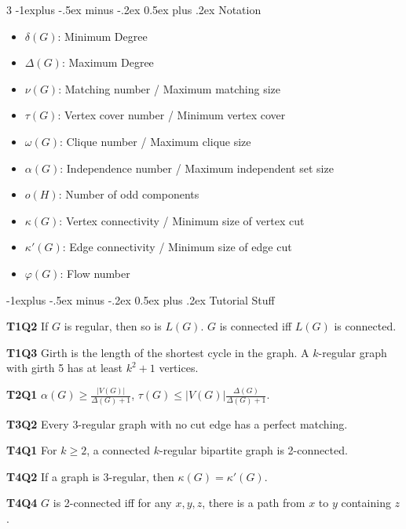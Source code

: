 \documentclass[10pt, landscape]{article}
\makeatletter
\renewcommand{\section}{\@startsection{section}{1}{0mm}%
                                {-1ex plus -.5ex minus -.2ex}%
                                {0.5ex plus .2ex}%
                                {\normalfont\large\bfseries}}
\renewcommand{\section}{\@startsection{section}{2}{0mm}%
                                {-1explus -.5ex minus -.2ex}%
                                {0.5ex plus .2ex}%
                                {\normalfont\normalsize\bfseries}}
\makeatother
\begin{document}
\begin{multicols*}{3}
\section{Notation}
\begin{itemize}
    \item \textbf{$\delta(G)$}: Minimum Degree
    \item \textbf{$\Delta(G)$}: Maximum Degree
    \item \textbf{$\nu(G)$}: Matching number / Maximum matching size
    \item \textbf{$\tau(G)$}: Vertex cover number / Minimum vertex cover
    \item \textbf{$\omega(G)$}: Clique number / Maximum clique size
    \item \textbf{$\alpha(G)$}: Independence number / Maximum independent set size
    \item \textbf{$o(H)$}: Number of odd components
    \item \textbf{$\kappa(G)$}: Vertex connectivity / Minimum size of vertex cut
    \item \textbf{$\kappa'(G)$}: Edge connectivity / Minimum size of edge cut
    \item \textbf{$\varphi(G)$}: Flow number
\end{itemize}

\section{Tutorial Stuff}

\textbf{T1Q2} If $G$ is regular, then so is $L(G)$. $G$ is connected iff $L(G)$ is connected.

\textbf{T1Q3} Girth is the length of the shortest cycle in the graph. A $k$-regular graph with girth 5 has at least $k^2+1$ vertices.

\textbf{T2Q1} $\alpha(G) \geq \frac{|V(G)|}{\Delta(G)+1}$, $\tau(G) \leq |V(G)|\frac{\Delta(G)}{\Delta(G)+1}$.

\textbf{T3Q2} Every $3$-regular graph with no cut edge has a perfect matching.

\textbf{T4Q1} For $k \geq 2$, a connected $k$-regular bipartite graph is 2-connected.

\textbf{T4Q2} If a graph is 3-regular, then $\kappa(G)=\kappa'(G)$.

\textbf{T4Q4} $G$ is 2-connected iff for any $x,y,z$, there is a path from $x$ to $y$ containing $z$.

\end{multicols*}
\end{document}
